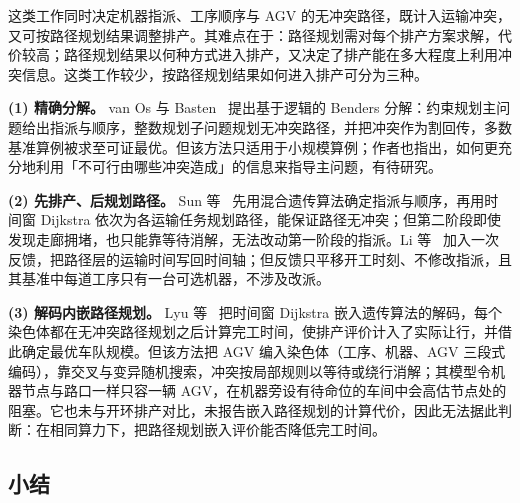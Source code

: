 \documentclass[manuscript,screen,review]{acmart}
\begin{document}
这类工作同时决定机器指派、工序顺序与 AGV 的无冲突路径，既计入运输冲突，又可按路径规划结果调整排产。其难点在于：路径规划需对每个排产方案求解，代价较高；路径规划结果以何种方式进入排产，又决定了排产能在多大程度上利用冲突信息。这类工作较少，按路径规划结果如何进入排产可分为三种。

\textbf{(1) 精确分解。} van Os 与 Basten~\cite{vanos2026exact} 提出基于逻辑的 Benders 分解：约束规划主问题给出指派与顺序，整数规划子问题规划无冲突路径，并把冲突作为割回传，多数基准算例被求至可证最优。但该方法只适用于小规模算例；作者也指出，如何更充分地利用「不可行由哪些冲突造成」的信息来指导主问题，有待研究。

\textbf{(2) 先排产、后规划路径。} Sun 等~\cite{sun2023integrated} 先用混合遗传算法确定指派与顺序，再用时间窗 Dijkstra 依次为各运输任务规划路径，能保证路径无冲突；但第二阶段即使发现走廊拥堵，也只能靠等待消解，无法改动第一阶段的指派。Li 等~\cite{li2026framework} 加入一次反馈，把路径层的运输时间写回时间轴；但反馈只平移开工时刻、不修改指派，且其基准中每道工序只有一台可选机器，不涉及改派。

\textbf{(3) 解码内嵌路径规划。} Lyu 等~\cite{lyu2019approach} 把时间窗 Dijkstra 嵌入遗传算法的解码，每个染色体都在无冲突路径规划之后计算完工时间，使排产评价计入了实际让行，并借此确定最优车队规模。但该方法把 AGV 编入染色体（工序、机器、AGV 三段式编码），靠交叉与变异随机搜索，冲突按局部规则以等待或绕行消解；其模型令机器节点与路口一样只容一辆 AGV，在机器旁设有待命位的车间中会高估节点处的阻塞。它也未与开环排产对比，未报告嵌入路径规划的计算代价，因此无法据此判断：在相同算力下，把路径规划嵌入评价能否降低完工时间。

\subsection{小结}
\end{document}
